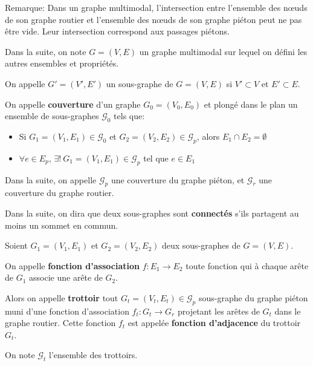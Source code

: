 \noindent
Remarque: Dans un graphe multimodal, l'intersection entre l'ensemble des nœuds de son graphe routier et l'ensemble des nœuds de son graphe piéton peut ne pas être vide. Leur intersection correspond aux passages piétons.

\noindent
Dans la suite, on note $G = (V,E)$ un graphe multimodal sur lequel on défini les autres ensembles et propriétés.

\begin{definition}
    On appelle $G' = (V',E')$ un sous-graphe de $G = (V,E)$ si $V' \subset V$ et $E' \subset E$.
\end{definition}

\begin{definition}
    On appelle \textbf{couverture} d'un graphe $G_0 = (V_0,E_0)$ et plongé dans le plan un ensemble de sous-graphes $\mathcal{G_0}$ tels que:
    \begin{itemize}
        \item Si $G_1=(V_1, E_1) \in \mathcal{G_0}$ et $G_2=(V_2, E_2) \in \mathcal{G}_p$, alors $E_1 \cap E_2 = \emptyset$
        \item $\forall e \in E_p$, $\exists!~G_1=(V_1, E_1) \in \mathcal{G}_p$ tel que $e \in E_1$
    \end{itemize}
\end{definition}

\noindent
Dans la suite, on appelle $\mathcal{G}_p$ une couverture du graphe piéton, et $\mathcal{G}_r$ une couverture du graphe routier.

\noindent
Dans la suite, on dira que deux sous-graphes sont \textbf{connectés} s'ils partagent au moins un sommet en commun.

\begin{definition}
    Soient $G_1=(V_1, E_1)$ et $G_2=(V_2, E_2)$ deux sous-graphes de $G=(V, E)$.
    
    On appelle \textbf{fonction d'association} $f: E_1 \rightarrow E_2$ toute fonction qui à chaque arête de $G_1$ associe une arête de $G_2$.
\end{definition}

\begin{definition}
    Alors on appelle \textbf{trottoir} tout $G_t = (V_t, E_t)\in \mathcal{G}_p$ sous-graphe du graphe piéton muni d'une fonction d'association $f_t: G_t \rightarrow G_r$ projetant les arêtes de $G_t$ dans le graphe routier. Cette fonction $f_t$ est appelée \textbf{fonction d'adjacence} du trottoir $G_t$.

    On note $\mathcal{G}_t$ l'ensemble des trottoirs.
\end{definition}

